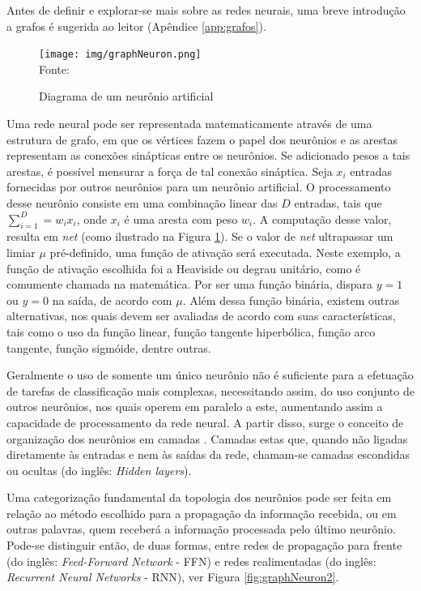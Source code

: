 Antes de definir e explorar-se mais sobre as redes neurais, uma breve introdução a grafos é sugerida ao leitor (Apêndice \ref{app:grafos}). 

\begin{figure}[ht!]
\caption{Diagrama de um neurônio artificial}
\label{fig:graphNeuron}
\centering
\texttt{[image: img/graphNeuron.png]}
{\fontsize{11pt}{\baselineskip}\selectfont
\\Fonte: \cite{Rauber2005}
}
\end{figure}

Uma rede neural pode ser representada matematicamente através de uma estrutura de grafo, em que os vértices fazem o papel dos neurônios e as arestas representam as conexões sinápticas entre os neurônios. Se adicionado pesos a tais arestas, é possível mensurar a força de tal conexão sináptica. Seja $x_i$ entradas fornecidas por outros neurônios para um neurônio artificial. O processamento desse neurônio consiste em uma combinação linear das $D$ entradas, tais que $\sum_{i=1}^{D} = w_i x_i$, onde $x_i$ é uma aresta com peso $w_i$. A computação desse valor, resulta em \textit{net} (como ilustrado na Figura \ref{fig:graphNeuron}). Se o valor de \textit{net} ultrapassar um limiar $\mu$ pré-definido, uma função de ativação será executada. Neste exemplo, a função de ativação escolhida foi a Heaviside ou degrau unitário, como é comumente chamada na matemática. Por ser uma função binária, dispara $y = 1$ ou $y = 0$ na saída, de acordo com $\mu$. Além dessa função binária, existem outras alternativas, nos quais devem ser avaliadas de acordo com suas características, tais como o uso da função linear, função tangente hiperbólica, função arco tangente, função sigmóide, dentre outras.
 
Geralmente o uso de somente um único neurônio não é suficiente para a efetuação de tarefas de classificação mais complexas, necessitando assim, do uso conjunto de outros neurônios, nos quais operem em paralelo a este, aumentando assim a capacidade de processamento da rede neural. A partir disso, surge o conceito de organização dos neurônios em camadas \citep{duda1973pattern, bishop2006pattern, martin2018speech}. Camadas estas que, quando não ligadas diretamente às entradas e nem às saídas da rede, chamam-se camadas escondidas ou ocultas (do inglês: \textit{Hidden layers}). 
 
Uma categorização fundamental da topologia dos neurônios pode ser feita em relação ao método escolhido para a propagação da informação recebida, ou em outras palavras, quem receberá a informação processada pelo último neurônio. Pode-se distinguir então, de duas formas, entre redes de propagação para frente (do inglês: \textit{Feed-Forward Network} - FFN) e redes realimentadas (do inglês: \textit{Recurrent Neural Networks} - RNN), ver Figura \ref{fig:graphNeuron2}.
 
